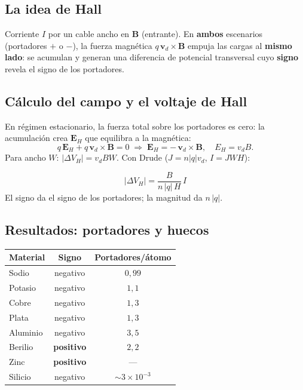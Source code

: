 \documentclass[12pt,a4paper]{article}
\begin{document}
\subsection{La idea de Hall}

Corriente $I$ por un cable ancho en $\mathbf{B}$ (entrante). En
\textbf{ambos} escenarios (portadores $+$ o $-$), la fuerza magnética
$q\,\mathbf{v}_d\times\mathbf{B}$ empuja las cargas al \textbf{mismo
lado}: se acumulan y generan una diferencia de potencial transversal cuyo
\textbf{signo} revela el signo de los portadores.



\subsection{Cálculo del campo y el voltaje de Hall}

En régimen estacionario, la fuerza total sobre los portadores es cero: la
acumulación crea $\mathbf{E}_H$ que equilibra a la magnética:
\[
q\,\mathbf{E}_H + q\,\mathbf{v}_d\times\mathbf{B} = 0
\;\Longrightarrow\;
\mathbf{E}_H = -\,\mathbf{v}_d\times\mathbf{B},
\quad E_H = v_d B.
\]
Para ancho $W$: $|\Delta V_H| = v_d B W$. Con Drude
($J = n|q|v_d$, $I = J W H$):

\begin{keybox}
  \[
  \boxed{|\Delta V_H| = \frac{B}{n\,|q|\,H}\, I}
  \]
  El signo da el signo de los portadores; la magnitud da $n\,|q|$.
\end{keybox}

\subsection{Resultados: portadores y huecos}

\begin{center}
\begin{tabular}{lcc}
\toprule
\textbf{Material} & \textbf{Signo} & \textbf{Portadores/átomo} \\
\midrule
Sodio & negativo & $0{,}99$ \\
Potasio & negativo & $1{,}1$ \\
Cobre & negativo & $1{,}3$ \\
Plata & negativo & $1{,}3$ \\
Aluminio & negativo & $3{,}5$ \\
Berilio & \textbf{positivo} & $2{,}2$ \\
Zinc & \textbf{positivo} & --- \\
Silicio & negativo & $\sim 3\times10^{-3}$ \\
\bottomrule
\end{tabular}
\end{center}
\end{document}
